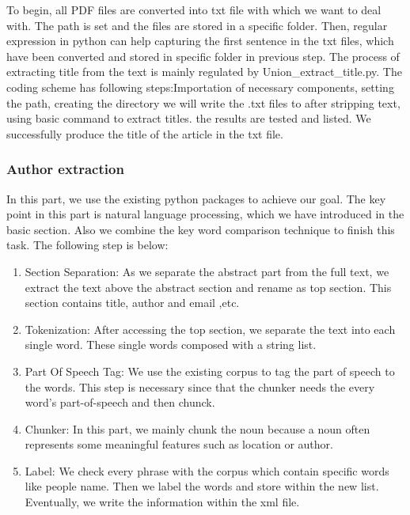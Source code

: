 To begin, all PDF files are converted into txt file with which we want to deal with.
The path is set and the files are stored in a specific folder.
Then, regular expression in python can help capturing the first sentence in the txt files, which have been converted and stored in specific folder in previous step.
The process of extracting title from the text is mainly regulated by Union\_extract\_title.py.
The coding scheme has following steps:Importation of necessary components, setting the path, creating the directory we will write the .txt files to after stripping text, using basic command to extract titles.
the results are tested and listed.
We successfully produce the title of the article in the txt file. 

\subsubsection{Author extraction}

In this part, we use the existing python packages to achieve our goal.
The key point in this part is natural language processing, which we have introduced in the basic section.
Also we combine the key word comparison technique to finish this task.
The following step is below:

\begin{enumerate}
	
	\item Section Separation: As we separate the abstract part from the full text, we extract the text above the 
	abstract section and rename as top section. 
	This section contains title, author and email ,etc.
	\item Tokenization: After accessing the top section, we separate the text into each single word. 
	These single words composed with a string list. 
	\item Part Of Speech Tag: We use the existing corpus to tag the part of speech to the words. 
	This step is necessary since that the chunker needs the every word's part-of-speech and then chunck.
	\item Chunker: In this part, we mainly chunk the noun because a noun often represents some meaningful features 
	such as location or author.
	\item Label: We check every phrase with the corpus which contain specific words like people name. 
	Then we label the words and store within the new list. 
	Eventually, we write the information within the xml file. 
	
\end{enumerate}

